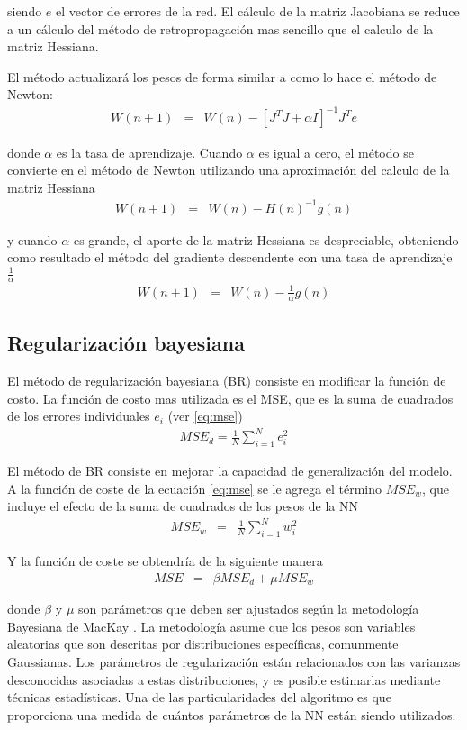 siendo $e$ el vector de errores de la red. El cálculo de la matriz Jacobiana se reduce a un cálculo del método de retropropagación \cite{Hagan1994} mas sencillo que el calculo de la matriz Hessiana.

El método actualizará los pesos de forma similar a como lo hace el método de Newton:
\begin{eqnarray}
	W(n + 1) &=& W(n) - [J^{T}J + \alpha I]^{-1}J^{T}e
\end{eqnarray}

donde $\alpha$ es la tasa de aprendizaje. Cuando $\alpha$ es igual a cero, el método se convierte en el método de Newton utilizando una aproximación del calculo de la matriz Hessiana
\begin{eqnarray}
	W(n + 1) &=& W(n) - H(n)^{-1}g(n)
\end{eqnarray}

y cuando $\alpha$ es grande, el aporte de la matriz Hessiana es despreciable, obteniendo como resultado el método del gradiente descendente con una tasa de aprendizaje $\frac{1}{\alpha}$
\begin{eqnarray}
	W(n + 1) &=& W(n) - \frac{1}{\alpha}g(n)
\end{eqnarray}

\subsection{Regularización bayesiana}
El método de regularización bayesiana (BR) consiste en modificar la función de costo. La función de costo mas utilizada es el MSE, que es la suma de cuadrados de los errores individuales $e_{i}$ (ver \ref{eq:mse})
\begin{eqnarray}
	MSE_{d} = \frac{1}{N}\sum_{i = 1}^{N}e_{i}^{2}\label{eq:mse}
\end{eqnarray}

El método de BR consiste en mejorar la capacidad de generalización del modelo. A la función de coste de la ecuación \ref{eq:mse} se le agrega el término $MSE_{w}$, que incluye el efecto de la suma de cuadrados de los pesos de la NN
\begin{eqnarray}
	MSE_{w} &=& \frac{1}{N}\sum_{i = 1}^{N}w_{i}^{2}
\end{eqnarray}

Y la función de coste se obtendría de la siguiente manera
\begin{eqnarray}
	MSE &=& \beta MSE_{d} + \mu MSE_{w}
\end{eqnarray}

donde $\beta$ y $\mu$ son parámetros que deben ser ajustados según la metodología Bayesiana de MacKay \cite{MacKay1992a, MacKay1992b}. La metodología asume que los pesos son variables aleatorias que son descritas por distribuciones específicas, comunmente Gaussianas. Los parámetros de regularización están relacionados con las varianzas desconocidas asociadas a estas distribuciones, y es posible estimarlas mediante técnicas estadísticas. Una de las particularidades del algoritmo es que proporciona una medida de cuántos parámetros de la NN están siendo utilizados.

